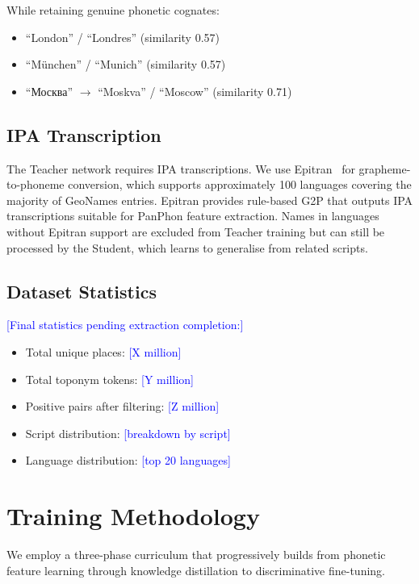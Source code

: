 \documentclass[11pt,a4paper]{article}
\newcommand{\placeholder}[1]{\textcolor{blue}{[#1]}}
\begin{document}
While retaining genuine phonetic cognates:

\begin{itemize}
    \item ``London'' / ``Londres'' (similarity 0.57)
    \item ``München'' / ``Munich'' (similarity 0.57)
    \item ``Москва'' $\rightarrow$ ``Moskva'' / ``Moscow'' (similarity 0.71)
\end{itemize}

\subsection{IPA Transcription}

The Teacher network requires IPA transcriptions. We use Epitran~\citep{mortensen2018} for grapheme-to-phoneme conversion, which supports approximately 100 languages covering the majority of GeoNames entries. Epitran provides rule-based G2P that outputs IPA transcriptions suitable for PanPhon feature extraction. Names in languages without Epitran support are excluded from Teacher training but can still be processed by the Student, which learns to generalise from related scripts.

\subsection{Dataset Statistics}

\placeholder{Final statistics pending extraction completion:}
\begin{itemize}
    \item Total unique places: \placeholder{X million}
    \item Total toponym tokens: \placeholder{Y million}
    \item Positive pairs after filtering: \placeholder{Z million}
    \item Script distribution: \placeholder{breakdown by script}
    \item Language distribution: \placeholder{top 20 languages}
\end{itemize}


\section{Training Methodology}
\label{sec:training}

We employ a three-phase curriculum that progressively builds from phonetic feature learning through knowledge distillation to discriminative fine-tuning.
\end{document}
